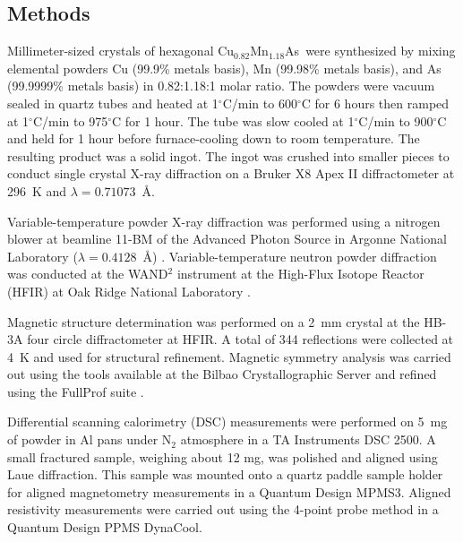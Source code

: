\documentclass[10pt,doublespacing,edeposit]{uiucthesis2020}
\newcommand*{\cumnas}{Cu$_{0.82}$Mn$_{1.18}$As}
\begin{document}
\begin{mainmatter}
\section{Methods}

Millimeter-sized crystals of hexagonal \cumnas\ were synthesized by mixing elemental powders Cu (99.9\% metals basis), Mn (99.98\% metals basis), and As (99.9999\% metals basis) in 0.82:1.18:1 molar ratio. 
The powders were vacuum sealed in quartz tubes and heated at 1$^\circ$C/min to 600$^{\circ}$C for 6 hours then ramped at 1$^{\circ}$C/min to 975$^{\circ}$C for 1 hour. The tube was slow cooled at 1$^{\circ}$C/min to 900$^{\circ}$C and held for 1 hour before furnace-cooling down to room temperature. The resulting product was a solid ingot. The ingot was crushed into smaller pieces to conduct single crystal X-ray diffraction on a Bruker X8 Apex II diffractometer at 296~K and $\lambda = 0.71073$~\AA. 


Variable-temperature powder X-ray diffraction was performed using a nitrogen blower at beamline 11-BM of the Advanced Photon Source in Argonne National Laboratory ($\lambda = 0.4128$~\AA) \cite{wang_dedicated_2008}. Variable-temperature neutron powder diffraction was conducted at the WAND$^2$ instrument at the High-Flux Isotope Reactor (HFIR) at Oak Ridge National Laboratory \cite{Frontzek_new}.


Magnetic structure determination was performed on a 2~mm crystal at the HB-3A four circle diffractometer at HFIR. A total of 344 reflections were collected at 4~K and used for structural refinement. Magnetic symmetry analysis was carried out using the tools available at the Bilbao Crystallographic Server \cite{Perez-Mato2015}
and refined using the FullProf suite \cite{rodriguez-carvajal_recent_1993}.

Differential scanning calorimetry (DSC) measurements were performed on 5~mg of powder in Al pans under N$_2$ atmosphere in a TA Instruments DSC 2500. A small fractured sample, weighing about 12 mg, was polished and aligned using Laue diffraction. This sample was mounted onto a quartz paddle sample holder for aligned magnetometry measurements in a Quantum Design MPMS3. Aligned resistivity measurements were carried out using the 4-point probe method in a Quantum Design PPMS DynaCool.


\end{mainmatter}
\end{document}
